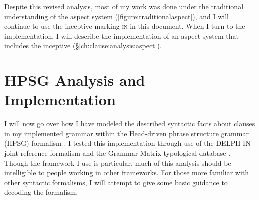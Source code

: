 \begin{comment}
\ex \label{ex:mul1}
\begingl
\glpreamble mułaa //
\gla muł-(y)aˑ //
\glb tide.comes.in-\textsc{cv} //
\glft tide starting to come up (\textbf{T}, Fidelia Haiyupis & \textsc{B}, Bob Mundy) //
\endgl
\xe

\ex \label{ex:mul2}
\begingl
\glpreamble muułšiƛ //
\gla muł-šiƛ-LS(?) //
\glb tide.comes.in-\textsc{mo}-\textsc{grad}(?) //
\glft tide coming in (\textbf{T}, Fidelia Haiyupis & \textsc{B}, Bob Mundy) //
\endgl
\xe

\ex \label{ex:mul3}
\begingl
\glpreamble mułiičiƛ //
\gla muł-a-LS //
\glb tide.comes.in-\textsc{mo}-\textsc{grad} //
\glft tide coming in (\textbf{T}, Fidelia Haiyupis & \textsc{B}, Bob Mundy) //
\endgl
\xe
\end{comment}




Despite this revised analysis, most of my work was done under the traditional understanding of the aspect system (\cref{figure:traditionalaspect}), and I will continue to use the inceptive marking \textsc{in} in this document. When I turn to the implementation, I will describe the implementation of an aspect system that includes the inceptive (\S\ref{ch:clause:analysis:aspect}).

\section{HPSG Analysis and Implementation} \label{ch:clause:analysis}

I will now go over how I have modeled the described syntactic facts about clauses in my implemented grammar within the Head-driven phrase structure grammar (HPSG) formalism \citep{pollardsag1994}. I tested this implementation through use of the DELPH-IN joint reference formalism \citep{copestake2002} and the Grammar Matrix typological database \citep{bender2002}. Though the framework I use is particular, much of this analysis should be intelligible to people working in other frameworks. For those more familiar with other syntactic formalisms, I will attempt to give some basic guidance to decoding the formalism.

